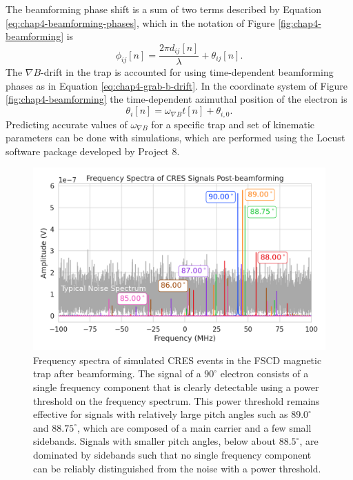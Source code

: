 The beamforming phase shift is a sum of two terms described by Equation \ref{eq:chap4-beamforming-phases}, which in the notation of Figure \ref{fig:chap4-beamforming} is
\begin{equation}
    \phi_{ij}[n]=\frac{2\pi d_{ij}[n]}{\lambda}+\theta_{ij}[n].
\end{equation}
The $\nabla B$-drift in the trap is accounted for using time-dependent beamforming phases as in Equation \ref{eq:chap4-grab-b-drift}. In the coordinate system of Figure \ref{fig:chap4-beamforming} the time-dependent azimuthal position of the electron is
\begin{equation}
    \theta_{i}[n]=\omega_{\nabla B}t[n]+\theta_{i,0}.
\end{equation}
Predicting accurate values of $\omega_{\nabla B}$ for a specific trap and set of kinematic parameters can be done with simulations, which are performed using the Locust software package \cite{p8locustpaper} developed by Project 8.

\begin{figure}[ht]
    \centering
    \includegraphics[width=.7\textwidth]{figs/Chapter-4/230313_cres_signal_post_bf_examples.png}
    \caption{Frequency spectra of simulated CRES events in the FSCD magnetic trap after beamforming. The signal of a $90^\circ$ electron consists of a single frequency component that is clearly detectable using a power threshold on the frequency spectrum. This power threshold remains effective for signals with relatively large pitch angles such as $89.0^\circ$ and $88.75^\circ$, which are composed of a main carrier and a few small sidebands. Signals with smaller pitch angles, below about $88.5^\circ$, are dominated by sidebands such that no single frequency component can be reliably distinguished from the noise with a power threshold.
    }
    \label{fig:signal_post_bf_example}
\end{figure}

